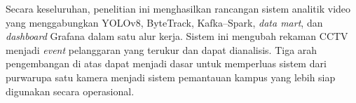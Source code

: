 Secara keseluruhan, penelitian ini menghasilkan rancangan sistem analitik video yang menggabungkan YOLOv8, ByteTrack, Kafka--Spark, \textit{data mart}, dan \textit{dashboard} Grafana dalam satu alur kerja. Sistem ini mengubah rekaman CCTV menjadi \textit{event} pelanggaran yang terukur dan dapat dianalisis. Tiga arah pengembangan di atas dapat menjadi dasar untuk memperluas sistem dari purwarupa satu kamera menjadi sistem pemantauan kampus yang lebih siap digunakan secara operasional.
